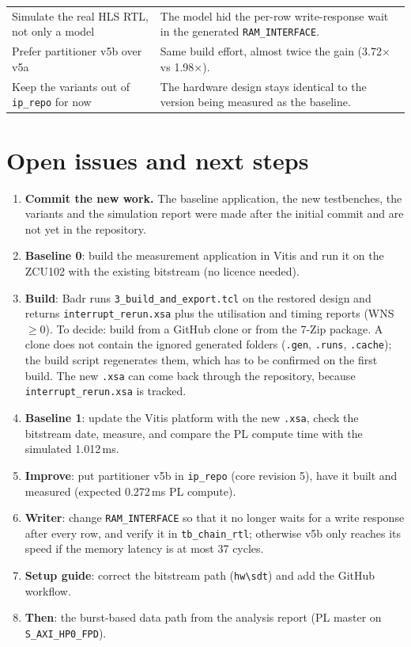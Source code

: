 \documentclass[11pt,a4paper]{article}
\newcommand{\code}[1]{\texttt{#1}}
\begin{document}
\begin{longtable}{@{}p{}p{}@{}}
Simulate the real HLS RTL, not only a model & The model hid the per-row write-response wait in the generated \code{RAM\_INTERFACE}. \\
Prefer partitioner v5b over v5a & Same build effort, almost twice the gain (3.72$\times$ vs 1.98$\times$). \\
Keep the variants out of \code{ip\_repo} for now & The hardware design stays identical to the version being measured as the baseline. \\
\bottomrule
\end{longtable}

\section{Open issues and next steps}
\begin{enumerate}[noitemsep]
  \item \textbf{Commit the new work.} The baseline application, the new testbenches, the variants and the simulation report were made after the initial commit and are not yet in the repository.
  \item \textbf{Baseline 0}: build the measurement application in Vitis and run it on the ZCU102 with the existing bitstream (no licence needed).
  \item \textbf{Build}: Badr runs \code{3\_build\_and\_export.tcl} on the restored design and returns \code{interrupt\_rerun.xsa} plus the utilisation and timing reports (WNS $\geq 0$). To decide: build from a GitHub clone or from the 7-Zip package. A clone does not contain the ignored generated folders (\code{.gen}, \code{.runs}, \code{.cache}); the build script regenerates them, which has to be confirmed on the first build. The new \code{.xsa} can come back through the repository, because \code{interrupt\_rerun.xsa} is tracked.
  \item \textbf{Baseline 1}: update the Vitis platform with the new \code{.xsa}, check the bitstream date, measure, and compare the PL compute time with the simulated 1.012\,ms.
  \item \textbf{Improve}: put partitioner v5b in \code{ip\_repo} (core revision 5), have it built and measured (expected 0.272\,ms PL compute).
  \item \textbf{Writer}: change \code{RAM\_INTERFACE} so that it no longer waits for a write response after every row, and verify it in \code{tb\_chain\_rtl}; otherwise v5b only reaches its speed if the memory latency is at most 37 cycles.
  \item \textbf{Setup guide}: correct the bitstream path (\code{hw\textbackslash sdt}) and add the GitHub workflow.
  \item \textbf{Then}: the burst-based data path from the analysis report (PL master on \code{S\_AXI\_HP0\_FPD}).
\end{enumerate}
\end{document}
